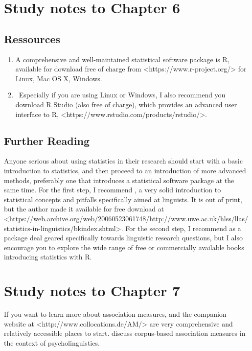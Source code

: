 \section{Study notes to Chapter 6}
\label{sec:studynotes06}

\subsection{Ressources}
\label{sec:ressources06}

\begin{enumerate}
  \item A comprehensive and well-maintained statistical software package is R, available for download free of charge from <https://www.r-project.org/> for Linux, Mac OS X, Windows.
  \item Especially if you are using Linux or Windows, I also recommend you download R Studio (also free of charge), which provides an advanced user interface to R, <https://www.rstudio.com/products/rstudio/>.
\end{enumerate}


\subsection{Further Reading}
\label{sec:furtherreading06}

Anyone serious about using statistics in their research should start with a basic introduction to statistics, and then proceed to an introduction of more advanced methods, preferably one that introduces a statistical software package at the same time. For the first step, I recommend \citet{butler_statistics_1985}, a very solid introduction to statistical concepts and pitfalls specifically aimed at linguists. It is out of print, but the author made it available for free download at <https://web.archive.org/web/20060523061748/http://www.uwe.ac.uk/hlss/llas/statistics-in-linguistics/bkindex.shtml>. For the second step, I recommend \citet{gries_statistics_2013} as a package deal geared specifically towards linguistic research questions, but I also encourage you to explore the wide range of free or commercially available books introducing statistics with R.


\section{Study notes to Chapter 7}
\label{sec:studynotes07}

If you want to learn more about association measures, \citet{evert_statistics_2005} and the companion website at <http://www.collocations.de/AM/> are very comprehensive and relatively accessible places to start. \citet{stefanowitsch_corpus-based_2016} discuss corpus-based association measures in the context of psycholinguistics.

